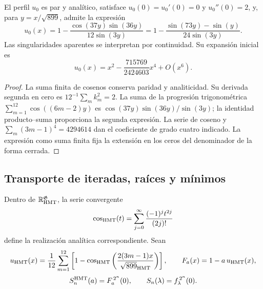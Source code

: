 \begin{proposition}
\label{hmtfg:forma-perfil}
El perfil \(u_0\) es par y analítico, satisface
\(u_0(0)=u_0'(0)=0\) y \(u_0''(0)=2\), y, para
\(y=x/\sqrt{899}\), admite la expresión
\[
 u_0(x)=1-\frac{\cos(37y)\sin(36y)}{12\sin(3y)}
       =1-\frac{\sin(73y)-\sin(y)}{24\sin(3y)}.
\]
Las singularidades aparentes se interpretan por continuidad.
Su expansión inicial es
\[
 u_0(x)=x^2-\frac{715769}{2424603}x^4+O(x^6).
\]
\end{proposition}
\begin{proof}
La suma finita de cosenos conserva paridad y analiticidad. Su derivada
segunda en cero es \(12^{-1}\sum_m k_m^2=2\).
La suma de la progresión trigonométrica
\(\sum_{m=1}^{12}\cos((6m-2)y)\) es
\(\cos(37y)\sin(36y)/\sin(3y)\); la identidad producto--suma
proporciona la segunda expresión. La serie de coseno y
\(\sum_m(3m-1)^4=4294614\) dan el coeficiente de grado cuatro
indicado. La expresión como suma finita fija la extensión en los
ceros del denominador de la forma cerrada.
\end{proof}

\subsection{Transporte de iteradas, raíces y mínimos}
\label{hmtfg:transporte-raices}

Dentro de \(\mathbb R_{\rm HMT}^{\mathfrak G}\), la serie convergente
\[
 \cos_{\rm HMT}(t)=\sum_{j=0}^{\infty}
                   \frac{(-1)^j t^{2j}}{(2j)!}
\]
define la realización analítica correspondiente. Sean
\[
 u_{\rm HMT}(x)=\frac1{12}\sum_{m=1}^{12}
  \left[1-\cos_{\rm HMT}
   \left(\frac{2(3m-1)x}{\sqrt{899}_{\rm HMT}}\right)\right],
 \qquad F_a(x)=1-a\,u_{\rm HMT}(x),
\]
\[
 S_n^{\rm HMT}(a)=F_a^{\,2^n}(0),\qquad
 S_n(\lambda)=f_\lambda^{\,2^n}(0).
\]

